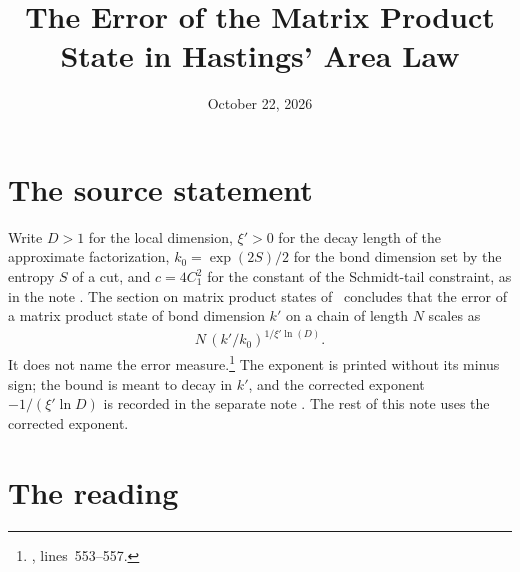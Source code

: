 \documentclass{article}
\title{The Error of the Matrix Product State in Hastings' Area Law}
\author{}
\date{October 22, 2026}
\begin{document}
\maketitle
{}

\section{The source statement}

Write $D>1$ for the local dimension, $\xi'>0$ for the decay length of the
approximate factorization, $k_0=\exp(2S)/2$ for the bond dimension set by the
entropy $S$ of a cut, and $c=4C_1^2$ for the constant of the Schmidt-tail
constraint, as in the note .
The section on matrix product states of~\cite{Hastings2007AreaLaw} concludes
that the error of a matrix product state of bond dimension $k'$ on a chain of
length $N$ scales as
\begin{align}
    N\,(k'/k_0)^{1/\xi'\ln(D)}.
    \label{eq:hastings07_mps_error_source}
\end{align}
It does not name the error measure.\footnote{,
    lines~553--557.} The exponent is printed without its minus sign; the bound
is meant to decay in $k'$, and the corrected exponent $-1/(\xi'\ln D)$ is
recorded in the separate note . The
rest of this note uses the corrected exponent.

\section{The reading}
\end{document}

